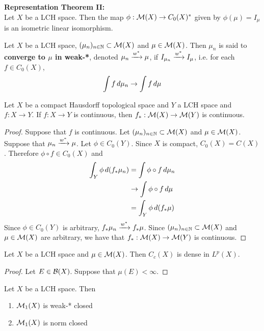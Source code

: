 \documentclass{book}
\begin{document}
	\begin{thm}\textbf{Representation Theorem II:}\\
	Let $X$ be a LCH space. Then the map $\phi: \mathcal{M}(X) \rightarrow C_0(X)^*$ given by $\phi(\mu) = I_{\mu}$ is an isometric linear isomorphism. 
	\end{thm}
	
	
	
	
	\begin{defn}  
	Let $X$ be a LCH space, $(\mu_n)_{n \in \mathbb{N}} \subset \mathcal{M}(X)$ and $\mu \in \mathcal{M}(X)$. Then $\mu_n$ is said to  \textbf{converge to $\mu$ in weak-*}, denoted $\mu_n \xrightarrow{w^*}\mu$, if $I_{\mu_n} \xrightarrow{w^*} I_{\mu}$, i.e. for each $f \in C_0(X)$, $$\int f \, d \mu_n \rightarrow \int f \, d \mu$$
	\end{defn}
	
	\begin{ex}  
		Let $X$ be a compact Hausdorff topological space and $Y$ a LCH space and $f:X \rightarrow Y$. If $f:X \rightarrow Y$ is continuous, then $f_*: \mathcal{M}(X) \rightarrow \mathcal{M}(Y)$ is continuous. 
	\end{ex}

	\begin{proof}
		Suppose that $f$ is continuous. Let $(\mu_n)_{n \in \mathbb{N}} \subset \mathcal{M}(X)$ and $\mu \in \mathcal{M}(X)$. Suppose that $\mu_n \xrightarrow{w^*} \mu$. Let $\phi \in C_0(Y)$. Since $X$ is compact, $C_0(X) = C(X)$. Therefore $\phi \circ f \in C_0(X)$ and 
		\begin{align*}
			\int_Y \phi \, d (f_* \mu_n) 
			& = \int \phi \circ f \, d \mu_n \\
			& \rightarrow  \int \phi \circ f \, d \mu \\
			& = \int_Y \phi \, d (f_* \mu) 
		\end{align*}
		Since $\phi \in C_0(Y)$ is arbitrary, $f_*\mu_n \xrightarrow{w^*} f_* \mu$. Since $(\mu_n)_{n \in \mathbb{N}} \subset \mathcal{M}(X)$ and $\mu \in \mathcal{M}(X)$ are arbitrary, we have that $f_*: \mathcal{M}(X) \rightarrow \mathcal{M}(Y)$ is continuous. 
	\end{proof}

	\begin{ex}
		Let $X$ be a LCH space and $\mu \in \mathcal{M}(X)$. Then $C_c(X)$ is dense in $L^p(X)$. 
	\end{ex}

	\begin{proof}
		Let $E \in \mathcal{B}(X)$. Suppose that $\mu(E) < \infty$. 
	\end{proof}

	\begin{ex}
		Let $X$ be a LCH space. Then 
		\begin{enumerate}
			\item $\mathcal{M}_1(X)$ is weak-* closed 
			\item $\mathcal{M}_1(X)$ is norm closed
		\end{enumerate} 
	\end{ex}
\end{document}
